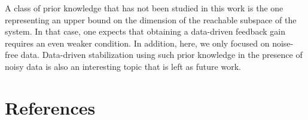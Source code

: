 \documentclass[9pt,shortpaper,twoside,web]{ieeecolor}
\begin{document}
A class of prior knowledge that has not been studied in this work is the one representing an upper bound on the dimension of the reachable subspace of the system. In that case, one expects that obtaining a data-driven feedback gain requires an even weaker condition. In addition, here, we only focused on noise-free data. Data-driven stabilization using such prior knowledge in the presence of noisy data is also an interesting topic that is left as future work. 

\section*{References}



\end{document}
